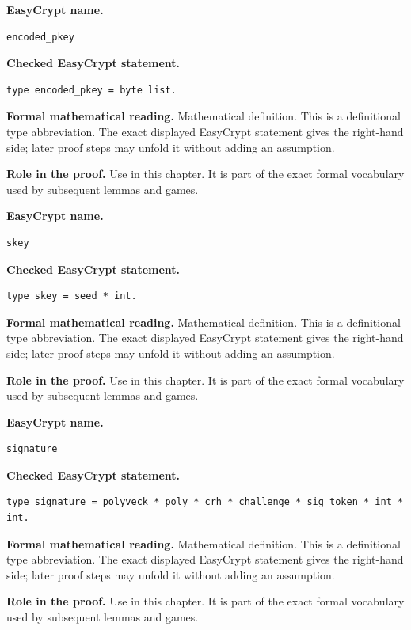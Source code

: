 \begin{formaldefinition}
\noindent\textbf{EasyCrypt name.}
\begin{lstlisting}[language=EasyCrypt,basicstyle=\ttfamily\scriptsize]
encoded_pkey
\end{lstlisting}
\noindent\textbf{Checked EasyCrypt statement.}
\begin{lstlisting}[language=EasyCrypt,basicstyle=\ttfamily\scriptsize]
type encoded_pkey = byte list.
\end{lstlisting}
\noindent\textbf{Formal mathematical reading.}
Mathematical definition. This is a definitional type abbreviation.  The exact displayed EasyCrypt statement gives the right-hand side; later proof steps may unfold it without adding an assumption.

\noindent\textbf{Role in the proof.}
Use in this chapter. It is part of the exact formal vocabulary used by subsequent lemmas and games.

\end{formaldefinition}

\begin{formaldefinition}
\noindent\textbf{EasyCrypt name.}
\begin{lstlisting}[language=EasyCrypt,basicstyle=\ttfamily\scriptsize]
skey
\end{lstlisting}
\noindent\textbf{Checked EasyCrypt statement.}
\begin{lstlisting}[language=EasyCrypt,basicstyle=\ttfamily\scriptsize]
type skey = seed * int.
\end{lstlisting}
\noindent\textbf{Formal mathematical reading.}
Mathematical definition. This is a definitional type abbreviation.  The exact displayed EasyCrypt statement gives the right-hand side; later proof steps may unfold it without adding an assumption.

\noindent\textbf{Role in the proof.}
Use in this chapter. It is part of the exact formal vocabulary used by subsequent lemmas and games.

\end{formaldefinition}

\begin{formaldefinition}
\noindent\textbf{EasyCrypt name.}
\begin{lstlisting}[language=EasyCrypt,basicstyle=\ttfamily\scriptsize]
signature
\end{lstlisting}
\noindent\textbf{Checked EasyCrypt statement.}
\begin{lstlisting}[language=EasyCrypt,basicstyle=\ttfamily\scriptsize]
type signature = polyveck * poly * crh * challenge * sig_token * int * int.
\end{lstlisting}
\noindent\textbf{Formal mathematical reading.}
Mathematical definition. This is a definitional type abbreviation.  The exact displayed EasyCrypt statement gives the right-hand side; later proof steps may unfold it without adding an assumption.

\noindent\textbf{Role in the proof.}
Use in this chapter. It is part of the exact formal vocabulary used by subsequent lemmas and games.

\end{formaldefinition}

